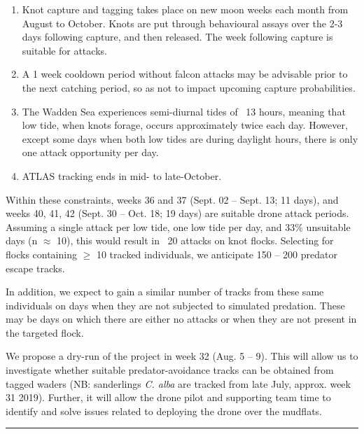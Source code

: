 \documentclass[10pt]{article}
\def\changemargin#1#2{\list{}{\rightmargin#2\leftmargin#1}\item[]}
\begin{document}
\begin{spacing}{1.15}
\begin{enumerate}
	\item 
	Knot capture and tagging takes place on new moon weeks each month from August to October. Knots are put through behavioural assays over the 2-3 days following capture, and then released. The week following capture is suitable for attacks.
	\item 
	A 1 week cooldown period without falcon attacks may be advisable prior to the next catching period, so as not to impact upcoming capture probabilities.
	\item
	The Wadden Sea experiences semi-diurnal tides of ~13 hours, meaning that low tide, when knots forage, occurs approximately twice each day. However, except some days when both low tides are during daylight hours, there is only one attack opportunity per day.
	\item 
	ATLAS tracking ends in mid- to late-October.
\end{enumerate}

Within these constraints, weeks 36 and 37 (Sept. 02 -- Sept. 13; 11 days), and weeks 40, 41, 42 (Sept. 30 -- Oct. 18; 19 days) are suitable drone attack periods. Assuming a single attack per low tide, one low tide per day, and 33\% unsuitable days (n $\approx$ 10), this would result in ~20 attacks on knot flocks. Selecting for flocks containing $\geq$ 10 tracked individuals, we anticipate 150 -- 200 predator escape tracks.

In addition, we expect to gain a similar number of tracks from these same individuals on days when they are not subjected to simulated predation. These may be days on which there are either no attacks or when they are not present in the targeted flock.

We propose a dry-run of the project in week 32 (Aug. 5 -- 9). This will allow us to investigate whether suitable predator-avoidance tracks can be obtained from tagged waders (NB: sanderlings \emph{C. alba} are tracked from late July, approx. week 31 2019). Further, it will allow the drone pilot and supporting team time to identify and solve issues related to deploying the drone over the mudflats.

\nolinenumbers

\noindent\hfil\rule{0.5\textwidth}{.4pt}\hfil

\end{spacing}

\footnotesize

\changemargin{-1.0cm}{-1.0cm}

\begin{multicols}{2}

\tiny{

\printbibliography

}

\end{multicols}
\end{document}
